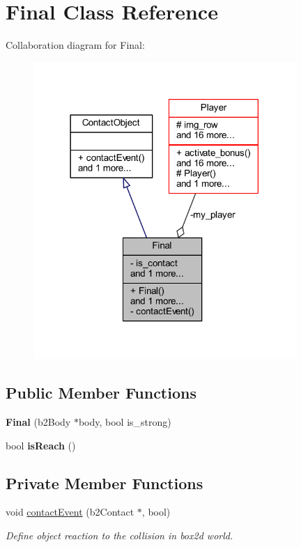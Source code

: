 \hypertarget{class_final}{}\section{Final Class Reference}
\label{class_final}


Collaboration diagram for Final\+:\nopagebreak
\begin{figure}[H]
\begin{center}
\leavevmode
\includegraphics[width=282pt]{class_final__coll__graph}
\end{center}
\end{figure}
\subsection*{Public Member Functions}
\begin{DoxyCompactItemize}
\item 
\mbox{\label{class_final_ad8e4afdefd9ea952bfbb7123af09c710}} 
{\bfseries Final} (b2\+Body $\ast$body, bool is\+\_\+strong)
\item 
\mbox{\label{class_final_af7a2beabd2de1cc0fcbe017f2012e41c}} 
bool {\bfseries is\+Reach} ()
\end{DoxyCompactItemize}
\subsection*{Private Member Functions}
\begin{DoxyCompactItemize}
\item 
void \hyperlink{class_final_a9ebc21296dd28e993f2ee8cbb47a3b37}{contact\+Event} (b2\+Contact $\ast$, bool)
\begin{DoxyCompactList}\small\item\em Define object reaction to the collision in box2d world. \end{DoxyCompactList}\end{DoxyCompactItemize}
